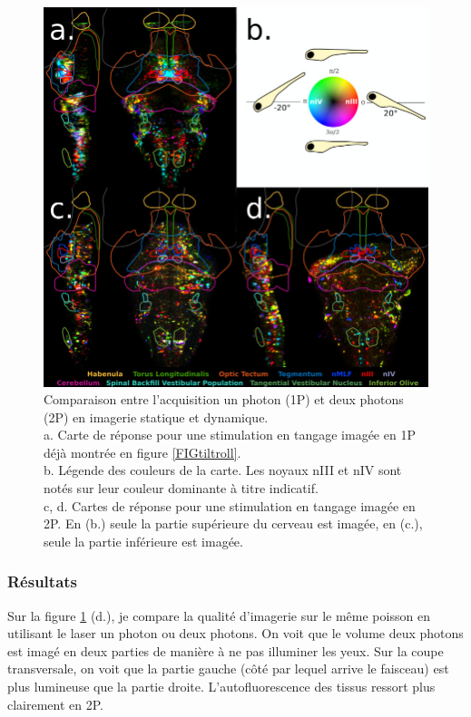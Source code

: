 \begin{figure}
    \centering
    \includegraphics[width=\textwidth]{./files/1P-2P.svg.jpg }
    \caption{Comparaison entre l'acquisition un photon (1P) et deux photons (2P) en imagerie statique et dynamique.
    \\ a. Carte de réponse pour une stimulation en tangage imagée en 1P déjà montrée en figure \ref{FIGtiltroll}.
    \\ b. Légende des couleurs de la carte. Les noyaux nIII et nIV sont notés sur leur couleur dominante à titre indicatif.
    \\ c, d. Cartes de réponse pour une stimulation en tangage imagée en 2P. En (b.) seule la partie supérieure du cerveau est imagée, en (c.), seule la partie inférieure est imagée.
    \label{FIG1P2P}}
    \end{figure}

\subsubsection{Résultats}

Sur la figure \ref{FIG1P2P} (d.), je compare la qualité d'imagerie sur le même poisson en utilisant le laser un photon ou deux photons. On voit que le volume deux photons est imagé en deux parties de manière à ne pas illuminer les yeux. Sur la coupe transversale, on voit que la partie gauche (côté par lequel arrive le faisceau) est plus lumineuse que la partie droite. L'autofluorescence des tissus ressort plus clairement en 2P.


